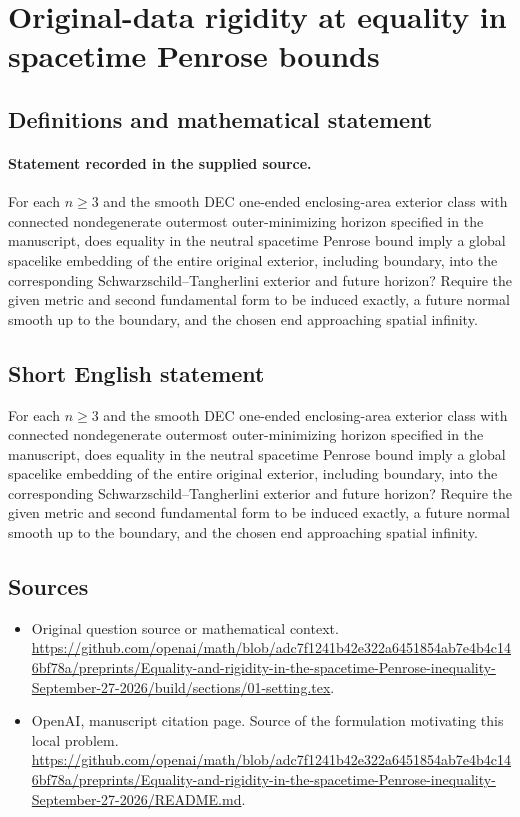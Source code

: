 \documentclass[11pt]{article}
\begin{document}
\section*{Original-data rigidity at equality in spacetime Penrose bounds}\label{statement}
\subsection{Definitions and mathematical statement}
\paragraph{Statement recorded in the supplied source.}
For each $n\geq 3$ and the smooth DEC one-ended enclosing-area exterior class with connected nondegenerate outermost outer-minimizing horizon specified in the manuscript, does equality in the neutral spacetime Penrose bound imply a global spacelike embedding of the entire original exterior, including boundary, into the corresponding Schwarzschild–Tangherlini exterior and future horizon? Require the given metric and second fundamental form to be induced exactly, a future normal smooth up to the boundary, and the chosen end approaching spatial infinity.
\subsection{Short English statement}
For each $n\geq 3$ and the smooth DEC one-ended enclosing-area exterior class with connected nondegenerate outermost outer-minimizing horizon specified in the manuscript, does equality in the neutral spacetime Penrose bound imply a global spacelike embedding of the entire original exterior, including boundary, into the corresponding Schwarzschild–Tangherlini exterior and future horizon? Require the given metric and second fundamental form to be induced exactly, a future normal smooth up to the boundary, and the chosen end approaching spatial infinity.
\subsection{Sources}
\begin{itemize}
\item[S1] Original question source or mathematical context.
\url{https://github.com/openai/math/blob/adc7f1241b42e322a6451854ab7e4b4c146bf78a/preprints/Equality-and-rigidity-in-the-spacetime-Penrose-inequality-September-27-2026/build/sections/01-setting.tex}.
\item[S2] OpenAI, manuscript citation page. Source of the formulation motivating this local problem.
\url{https://github.com/openai/math/blob/adc7f1241b42e322a6451854ab7e4b4c146bf78a/preprints/Equality-and-rigidity-in-the-spacetime-Penrose-inequality-September-27-2026/README.md}.
\end{itemize}
\end{document}

